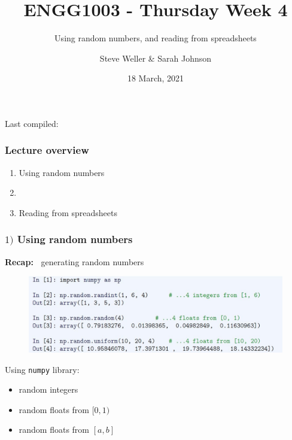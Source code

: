 \documentclass[english,14pt]{beamer}
\title{ENGG1003 - Thursday Week 4}
\subtitle{Using random numbers, and reading from spreadsheets}
\author{Steve Weller \& Sarah Johnson}
\institute{University of Newcastle}
\date{18 March, 2021}
\begin{document}
\begin{flushleft}
{\scriptsize Last compiled:~\DTMnow}
\vspace*{-5mm}
\end{flushleft}
\framebreak


\begin{frame}[fragile]

\frametitle{Lecture overview}
\begin{enumerate}
	\item Using random numbers

	\item[]
	
	\item Reading from spreadsheets

\end{enumerate}

\end{frame}


\begin{frame}[fragile]

\frametitle{$1)$ Using random numbers}

\textbf{Recap:~} generating random numbers

\begin{figure}[ht]
	\centering
	\includegraphics[width=\textwidth]{figures/LLp55b}
\end{figure}
\vspace*{-3mm}
Using \texttt{numpy} library:
\begin{itemize}
	\item random integers
	\item random floats from $[0,1)$
	\item random floats from $[a,b]$
\end{itemize}

\end{frame}

\end{document}
